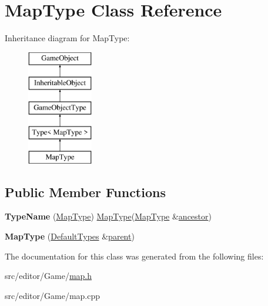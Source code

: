 \hypertarget{class_map_type}{\section{\-Map\-Type \-Class \-Reference}
\label{class_map_type}
}
\-Inheritance diagram for \-Map\-Type\-:\begin{figure}[H]
\begin{center}
\leavevmode
\includegraphics[height=5.000000cm]{class_map_type}
\end{center}
\end{figure}
\subsection*{\-Public \-Member \-Functions}
\begin{DoxyCompactItemize}
\item 
\hypertarget{class_map_type_a6c809cfddab56db0d71633514edd4861}{{\bfseries \-Type\-Name} (\hyperlink{class_map_type}{\-Map\-Type}) \hyperlink{class_map_type}{\-Map\-Type}(\hyperlink{class_map_type}{\-Map\-Type} \&\hyperlink{class_inheritable_object_ac87a3c55ca4be252c527a29fe162bb15}{ancestor})}\label{class_map_type_a6c809cfddab56db0d71633514edd4861}

\item 
\hypertarget{class_map_type_affc4d021aa814cfc93096498b0395ba2}{{\bfseries \-Map\-Type} (\hyperlink{class_default_types}{\-Default\-Types} \&\hyperlink{class_game_object_af3deaf39cde23c189765634e32e95bb4}{parent})}\label{class_map_type_affc4d021aa814cfc93096498b0395ba2}

\end{DoxyCompactItemize}


\-The documentation for this class was generated from the following files\-:\begin{DoxyCompactItemize}
\item 
src/editor/\-Game/\hyperlink{map_8h}{map.\-h}\item 
src/editor/\-Game/map.\-cpp\end{DoxyCompactItemize}
